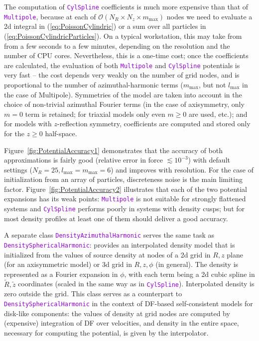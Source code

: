 \documentclass[12pt]{article}
\newcommand{\ttt}[1]{\textcolor{darkviolet}{\texttt{#1}}}
\begin{document}
The computation of \ttt{CylSpline} coefficients is much more expensive than that of \ttt{Multipole}, because at each of $\mathcal{O}(N_R\times N_z \times m_\mathrm{max})$ nodes we need to evaluate a 2d integral in (\ref{eq:PoissonCylindric}) or a sum over all particles in (\ref{eq:PoissonCylindricParticles}). On a typical workstation, this may take from from a few seconds to a few minutes, depending on the resolution and the number of CPU cores. Nevertheless, this is a one-time cost; once the coefficients are calculated, the evaluation of both \ttt{Multipole} and \ttt{CylSpline} potentials is very fast -- the cost depends very weakly on the number of grid nodes, and is proportional to the number of azimuthal-harmonic terms ($m_\mathrm{max}$, but not $l_\mathrm{max}$ in the case of Multipole).
Symmetries of the model are taken into account in the choice of non-trivial azimuthal Fourier terms (in the case of axisymmetry, only $m=0$ term is retained; for triaxial models only even $m\ge 0$ are used, etc.); and for models with $z$-reflection symmetry, coefficients are computed and stored only for the $z\ge 0$ half-space.

Figure~\ref{fig:PotentialAccuracy1} demonstrates that the accuracy of both approximations is fairly good (relative error in force $\lesssim 10^{-3}$) with default settings ($N_R=25, l_\mathrm{max}=m_\mathrm{max}=6$) and improves with resolution. For the case of initialization from an array of particles, discreteness noise is the main limiting factor.
Figure~\ref{fig:PotentialAccuracy2} illustrates that each of the two potential expansions has its weak points: \ttt{Multipole} is not suitable for strongly flattened systems and \ttt{CylSpline} performs poorly in systems with density cusps; but for most density profiles at least one of them should deliver a good accuracy.

\label{sec:DensityAzimuthalHarmonic} A separate class \ttt{DensityAzimuthalHarmonic} serves the same task as \ttt{Density\-Spherical\-Harmonic}: provides an interpolated density model that is initialized from the values of source density at nodes of a 2d grid in $R,z$ plane (for an axisymmetric model) or 3d grid in $R,z,\phi$ (in general). The density is represented as a Fourier expansion in $\phi$, with each term being a 2d cubic spline in $\tilde R, \tilde z$ coordinates (scaled in the same way as in \ttt{CylSpline}). Interpolated density is zero outside the grid. This class serves as a counterpart to \ttt{DensitySphericalHarmonic} in the context of DF-based self-consistent models for disk-like components: the values of density at grid nodes are computed by (expensive) integration of DF over velocities, and density in the entire space, necessary for computing the potential, is given by the interpolator.
\end{document}
